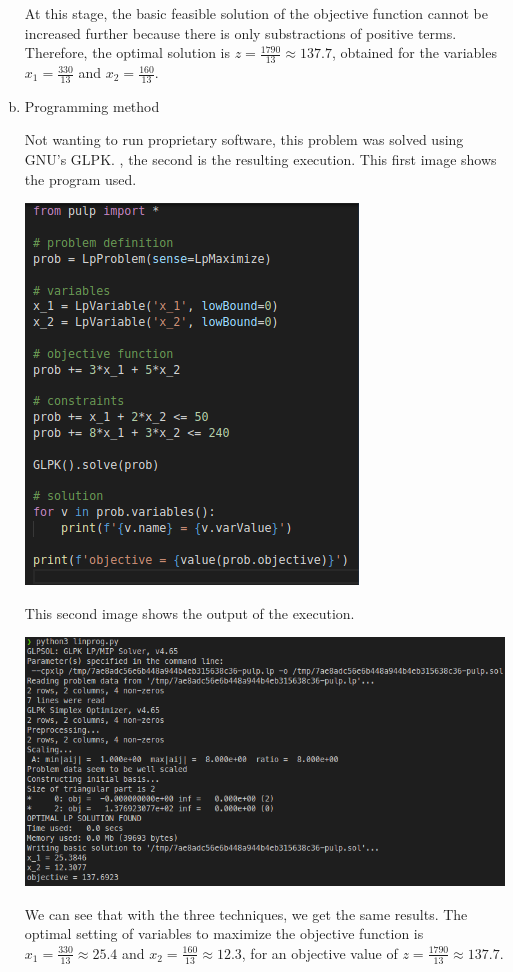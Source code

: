 \documentclass[a4paper, 10pt, twoside]{article}
\begin{document}
\begin{enumerate}[a)]
          At this stage, the basic feasible solution of the objective function cannot be increased further because there is only substractions of positive terms. Therefore, the optimal solution is $z = \frac{1790}{13} \approx 137.7$, obtained for the variables $x_1 = \frac{330}{13}$ and $x_2 = \frac{160}{13}$.

    \item Programming method

          Not wanting to run proprietary software, this problem was solved using GNU's GLPK. , the second is the resulting execution.
          This first image shows the program used.
          \begin{center}
              \includegraphics[width = .5 \textwidth]{linprog_script.png}
          \end{center}
          This second image shows the output of the execution.
          \begin{center}
            \includegraphics[width = .5 \textwidth]{linprog_run.png}
          \end{center}

    We can see that with the three techniques, we get the same results. The optimal setting of variables to maximize the objective function is $x_1 = \frac{330}{13} \approx 25.4$ and $x_2 = \frac{160}{13} \approx 12.3$, for an objective value of $z = \frac{1790}{13} \approx 137.7.$
\end{enumerate}
\end{document}
